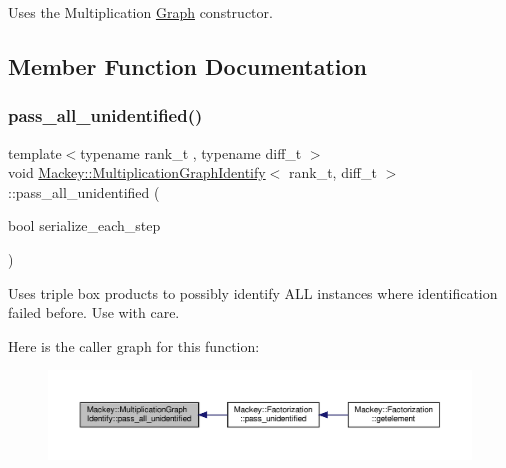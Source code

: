 Uses the Multiplication \hyperlink{classMackey_1_1Graph}{Graph} constructor. 



\subsection{Member Function Documentation}
\mbox{\label{classMackey_1_1MultiplicationGraphIdentify_ab0b4e28dd9134d591305dde1c02b3da5}} 
\subsubsection{\texorpdfstring{pass\+\_\+all\+\_\+unidentified()}{pass\_all\_unidentified()}}
{\footnotesize\ttfamily template$<$typename rank\+\_\+t , typename diff\+\_\+t $>$ \\
void \hyperlink{classMackey_1_1MultiplicationGraphIdentify}{Mackey\+::\+Multiplication\+Graph\+Identify}$<$ rank\+\_\+t, diff\+\_\+t $>$\+::pass\+\_\+all\+\_\+unidentified (\begin{DoxyParamCaption}\item[{bool}]{serialize\+\_\+each\+\_\+step }\end{DoxyParamCaption})\hspace{0.3cm}{\ttfamily [protected]}}



Uses triple box products to possibly identify A\+LL instances where identification failed before. Use with care. 

Here is the caller graph for this function\+:\nopagebreak
\begin{figure}[H]
\begin{center}
\leavevmode
\includegraphics[width=350pt]{classMackey_1_1MultiplicationGraphIdentify_ab0b4e28dd9134d591305dde1c02b3da5_icgraph}
\end{center}
\end{figure}
\mbox{\label{classMackey_1_1MultiplicationGraphIdentify_a9791070d75d845d15f1763c03db0b5ce}} 
